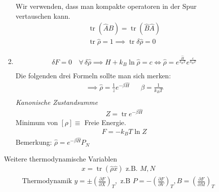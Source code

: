 \documentclass[11pt]{article}
\theoremstyle{plain}
\newcommand{\pd}[2]{\frac{\partial #1 }{\partial #2}}
\newcommand{\trace}{\operatorname{tr}}
\begin{document}
\begin{description}
\begin{enumerate}
      Wir verwenden, dass man kompakte operatoren in der Spur vertauschen kann.
      \begin{align*}
        \trace (\hat{A} \hat{B}) = \trace (\hat{B} \hat{A})  \\
        \trace \hat{\rho} = 1 \implies \trace \delta \hat{\rho} = 0
      \end{align*}
    \item
      \begin{align*}
        \delta F = 0 \quad\forall\, \delta \hat{\rho} \implies 
        H + k_B \ln{\hat{\rho}} = c \iff
        \hat{\rho} = e^{ \frac{\hat{H}}{k_B T} } e^{ \frac{c}{ k_B T}} \\
      \end{align*}
      Die folgenden drei Formeln sollte man sich merken:
      \begin{align*}
        \implies \hat{\rho} = \frac{1}{z} e^{-\beta \hat{H}} && \beta = \frac{1}{k_B T} \\
      \end{align*}
      \emph{Kanonische Zustandsumme}
      \begin{align*}
         Z = \trace e^{-\beta \hat{H}} 
      \end{align*}
      Minimum von $[\rho] \equiv $ Freie Energie.
      \begin{align*}
        F = -k_B T \ln{Z} 
      \end{align*}
      Bemerkung: $\hat{\rho} = e^{-\beta \hat{H}} P_N$
    \end{enumerate}
    Weitere thermodynamische Variablen %
    \begin{align*}
      x = \trace (\hat{\rho} \hat{x}) \text{ z.B. } M,N
    \end{align*}
    \begin{align*}
      \text{Thermodynamik } y = \pm \left( \pd{F}{X}  \right)_T, 
      \text{ z.B } P = - \left( \pd{F}{V} \right)_T, B = 
      \left( \pd{F}{M} \right)_T
    \end{align*}
\end{description}
\end{document}
